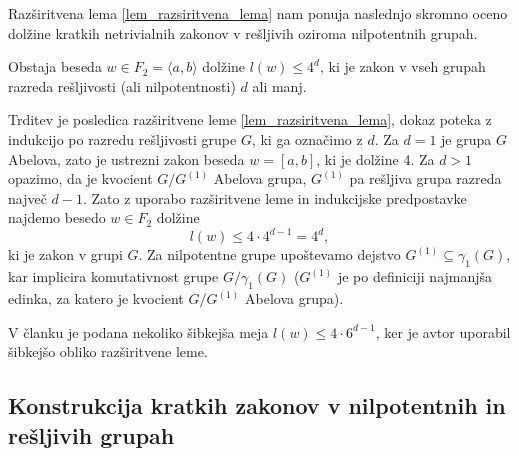     Razširitvena lema \ref{lem_razsiritvena_lema} nam ponuja naslednjo skromno oceno dolžine kratkih netrivialnih zakonov v rešljivih oziroma nilpotentnih grupah.

    \begin{trditev}
    \label{trd_ocitna_meja_za_kratke_zakone_resljive_grupe}
     Obstaja beseda $w \in F_2 = \langle a,  b \rangle$ dolžine $l(w) \le 4^{d}$, ki je zakon v vseh grupah razreda rešljivosti (ali nilpotentnosti) $d$ ali manj.  
    \end{trditev}
    \begin{dokaz}
        Trditev je posledica razširitvene leme \ref{lem_razsiritvena_lema}, dokaz poteka z indukcijo po razredu rešljivosti grupe $G$, ki ga označimo z $d$. Za $d = 1$ je grupa $G$ Abelova, zato je ustrezni zakon beseda $w = [a, b]$, ki je dolžine 4.
        Za $d > 1$ opazimo, da je kvocient $G / G^{(1)}$ Abelova grupa, $G^{(1)}$ pa rešljiva grupa razreda največ $d - 1$. Zato z uporabo razširitvene leme in indukcijske predpostavke najdemo besedo $w \in  F_2$ dolžine \begin{equation*}
            l(w) \le  4 \cdot 4^{d - 1} = 4^{d},
        \end{equation*}  
        ki je zakon v grupi $G$. Za nilpotentne grupe upoštevamo dejstvo $G^{(1)} \subseteq \gamma_1(G)$, kar implicira komutativnost grupe $G / \gamma_1(G)$ ($G^{(1)}$ je po definiciji najmanjša edinka, za katero je kvocient $G / G^{(1)}$ Abelova grupa). 
    \end{dokaz}
    
    \begin{opomba}
    V članku \cite[str.~8]{Kozma_Thom_2016} je podana nekoliko šibkejša meja $l(w) \le  4 \cdot 6^{d-1}$, ker je avtor uporabil šibkejšo obliko razširitvene leme.
    \end{opomba}

\subsection{Konstrukcija kratkih zakonov v nilpotentnih in rešljivih grupah}

